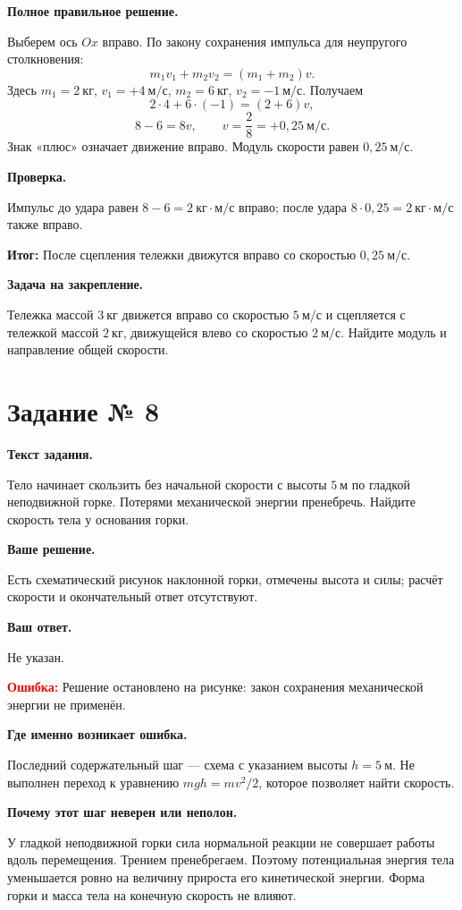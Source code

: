 \documentclass[11pt,a4paper]{article}
\newcommand{\reviewblock}[2]{\par\medskip\noindent\textbf{#1}\par\noindent#2\par}
\newcommand{\errorblock}[1]{\par\medskip\noindent\textcolor{red}{\textbf{Ошибка:}} #1\par}
\newcommand{\resultblock}[1]{\par\medskip\noindent\textcolor{teal!60!black}{\textbf{Итог:}} #1\par}
\begin{document}
\reviewblock{Полное правильное решение.}{Выберем ось $Ox$ вправо. По закону сохранения импульса для неупругого столкновения:
\[m_1v_1+m_2v_2=(m_1+m_2)v.\]
Здесь $m_1=2\ \text{кг}$, $v_1=+4\ \text{м/с}$, $m_2=6\ \text{кг}$, $v_2=-1\ \text{м/с}$. Получаем
\[2\cdot4+6\cdot(-1)=(2+6)v,\]
\[8-6=8v,\qquad v=\frac28=+0{,}25\ \text{м/с}.\]
Знак «плюс» означает движение вправо. Модуль скорости равен $0{,}25\ \text{м/с}$.}

\reviewblock{Проверка.}{Импульс до удара равен $8-6=2\ \text{кг}\cdot\text{м/с}$ вправо; после удара $8\cdot0{,}25=2\ \text{кг}\cdot\text{м/с}$ также вправо.}

\resultblock{После сцепления тележки движутся вправо со скоростью $0{,}25\ \text{м/с}$.}

\reviewblock{Задача на закрепление.}{Тележка массой $3\ \text{кг}$ движется вправо со скоростью $5\ \text{м/с}$ и сцепляется с тележкой массой $2\ \text{кг}$, движущейся влево со скоростью $2\ \text{м/с}$. Найдите модуль и направление общей скорости.}
\newpage
{}\label{task:8}

\section*{Задание № 8}

\reviewblock{Текст задания.}{Тело начинает скользить без начальной скорости с высоты $5\ \text{м}$ по гладкой неподвижной горке. Потерями механической энергии пренебречь. Найдите скорость тела у основания горки.}

\reviewblock{Ваше решение.}{Есть схематический рисунок наклонной горки, отмечены высота и силы; расчёт скорости и окончательный ответ отсутствуют.}

\reviewblock{Ваш ответ.}{Не указан.}

\errorblock{Решение остановлено на рисунке: закон сохранения механической энергии не применён.}

\reviewblock{Где именно возникает ошибка.}{Последний содержательный шаг --- схема с указанием высоты $h=5\ \text{м}$. Не выполнен переход к уравнению $mgh=mv^2/2$, которое позволяет найти скорость.}

\reviewblock{Почему этот шаг неверен или неполон.}{У гладкой неподвижной горки сила нормальной реакции не совершает работы вдоль перемещения. Трением пренебрегаем. Поэтому потенциальная энергия тела уменьшается ровно на величину прироста его кинетической энергии. Форма горки и масса тела на конечную скорость не влияют.}
\end{document}
